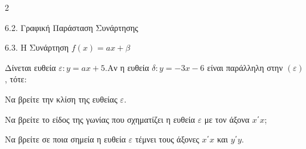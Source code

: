 \begin{ylh}{2}
    \item 6.2. Γραφική Παράσταση Συνάρτησης
    \item 6.3. Η Συνάρτηση $f(x)=ax+\beta$
\end{ylh}
Δίνεται ευθεία $\varepsilon: y=ax+5$.Αν η ευθεία $\delta : y=-3x-6$ είναι παράλληλη στην $(\varepsilon)$, τότε:
\begin{alist}
\item
  Να βρείτε την κλίση της ευθείας $\varepsilon$. 
\item
  Να βρείτε το είδος της γωνίας που σχηματίζει η ευθεία $\varepsilon$ με τον άξονα $x΄x$;
\item Να βρείτε σε ποια σημεία η ευθεία $\varepsilon$ τέμνει τους άξονες $x΄x$ και $y΄y$. 
\end{alist}

